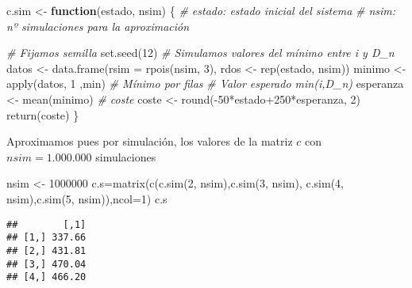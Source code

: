 \documentclass[
]{book}
\newenvironment{Shaded}{\begin{snugshade}}{\end{snugshade}}
\newcommand{\AttributeTok}[1]{\textcolor[rgb]{0.77,0.63,0.00}{#1}}
\newcommand{\CommentTok}[1]{\textcolor[rgb]{0.56,0.35,0.01}{\textit{#1}}}
\newcommand{\ControlFlowTok}[1]{\textcolor[rgb]{0.13,0.29,0.53}{\textbf{#1}}}
\newcommand{\DecValTok}[1]{\textcolor[rgb]{0.00,0.00,0.81}{#1}}
\newcommand{\FunctionTok}[1]{\textcolor[rgb]{0.00,0.00,0.00}{#1}}
\newcommand{\NormalTok}[1]{#1}
\newcommand{\OtherTok}[1]{\textcolor[rgb]{0.56,0.35,0.01}{#1}}
\newcommand{\SpecialCharTok}[1]{\textcolor[rgb]{0.00,0.00,0.00}{#1}}
\theoremstyle{definition}
\theoremstyle{definition}
\theoremstyle{definition}
\theoremstyle{definition}
\theoremstyle{remark}
\begin{document}
\begin{Shaded}
\begin{Highlighting}[]
\NormalTok{c.sim }\OtherTok{\textless{}{-}} \ControlFlowTok{function}\NormalTok{(estado, nsim)}
\NormalTok{\{}
  \CommentTok{\# estado: estado inicial del sistema}
  \CommentTok{\# nsim: nº simulaciones para la aproximación}
  
  \CommentTok{\# Fijamos semilla}
  \FunctionTok{set.seed}\NormalTok{(}\DecValTok{12}\NormalTok{)}
  \CommentTok{\# Simulamos valores del mínimo entre i y D\_n}
\NormalTok{  datos }\OtherTok{\textless{}{-}} \FunctionTok{data.frame}\NormalTok{(}\AttributeTok{rsim =} \FunctionTok{rpois}\NormalTok{(nsim, }\DecValTok{3}\NormalTok{), rdos }\OtherTok{\textless{}{-}} \FunctionTok{rep}\NormalTok{(estado, nsim))}
\NormalTok{  minimo }\OtherTok{\textless{}{-}}\FunctionTok{apply}\NormalTok{(datos, }\DecValTok{1}\NormalTok{ ,min) }\CommentTok{\# Mínimo por filas}
  \CommentTok{\# Valor esperado min(i,D\_n)}
\NormalTok{  esperanza }\OtherTok{\textless{}{-}} \FunctionTok{mean}\NormalTok{(minimo)}
  \CommentTok{\# coste}
\NormalTok{  coste }\OtherTok{\textless{}{-}} \FunctionTok{round}\NormalTok{(}\SpecialCharTok{{-}}\DecValTok{50}\SpecialCharTok{*}\NormalTok{estado}\SpecialCharTok{+}\DecValTok{250}\SpecialCharTok{*}\NormalTok{esperanza, }\DecValTok{2}\NormalTok{)}
  \FunctionTok{return}\NormalTok{(coste)}
\NormalTok{\}}
\end{Highlighting}
\end{Shaded}

Aproximamos pues por simulación, los valores de la matriz \(c\) con \(nsim=1.000.000\) simulaciones

\begin{Shaded}
\begin{Highlighting}[]
\NormalTok{nsim }\OtherTok{\textless{}{-}} \DecValTok{1000000}
\NormalTok{c.s}\OtherTok{=}\FunctionTok{matrix}\NormalTok{(}\FunctionTok{c}\NormalTok{(}\FunctionTok{c.sim}\NormalTok{(}\DecValTok{2}\NormalTok{, nsim),}\FunctionTok{c.sim}\NormalTok{(}\DecValTok{3}\NormalTok{, nsim),}
      \FunctionTok{c.sim}\NormalTok{(}\DecValTok{4}\NormalTok{, nsim),}\FunctionTok{c.sim}\NormalTok{(}\DecValTok{5}\NormalTok{, nsim)),}\AttributeTok{ncol=}\DecValTok{1}\NormalTok{)}
\NormalTok{c.s}
\end{Highlighting}
\end{Shaded}

\begin{verbatim}
##        [,1]
## [1,] 337.66
## [2,] 431.81
## [3,] 470.04
## [4,] 466.20
\end{verbatim}
\end{document}
